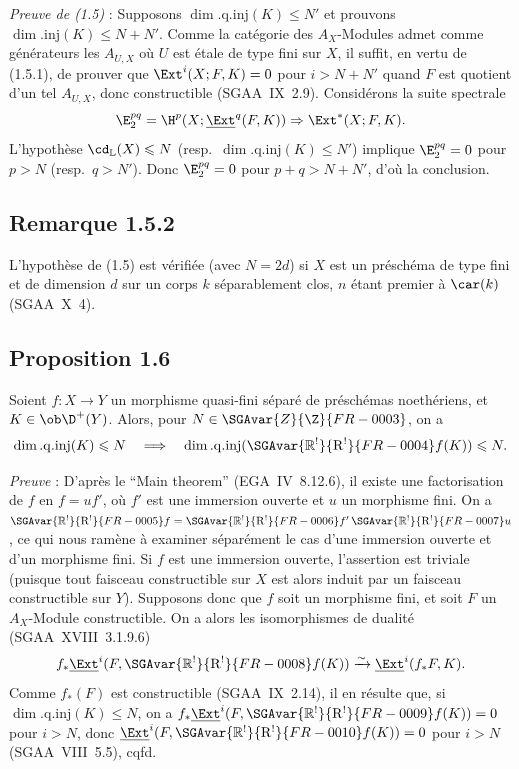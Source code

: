 \emph{Preuve de (1.5)} : Supposons $\dim.\mathrm{q.inj}(K) \leqslant N'$ et prouvons $\dim.\mathrm{inj}(K) \leqslant N + N'$. Comme la catégorie des $A_X$-Modules admet comme générateurs les $A_{U,X}$ où $U$ est étale de type fini sur $X$, il suffit, en vertu de (1.5.1), de prouver que $\Ext^i(X; F,K) = 0$ pour $i > N + N'$ quand $F$ est quotient d'un tel $A_{U,X}$, donc constructible (SGAA~IX~2.9). Considérons la suite spectrale
\[
\E_2^{pq} = \H^p(X; \underline{\Ext}^q(F,K)) \Rightarrow \Ext^{*}(X; F,K).
\]
L'hypothèse $\cd_{\mathbb{L}}(X) \leqslant N$ (resp.~$\dim.\mathrm{q.inj}(K) \leqslant N'$) implique $\E_2^{pq} = 0$ pour $p > N$ (resp.~$q > N'$). Donc $\E_2^{pq} = 0$ pour $p+q > N+N'$, d'où la conclusion.

\subsection*{Remarque 1.5.2}
L'hypothèse de (1.5) est vérifiée (avec $N = 2d$) si $X$ est un préschéma de type fini et de dimension $d$ sur un corps $k$ séparablement clos, $n$ étant premier à $\car(k)$ (SGAA~X~4).

\subsection*{Proposition 1.6}
Soient $f : X \to Y$ un morphisme quasi-fini séparé de préschémas noethériens, et $K \in \ob \D^{+}(Y)$. Alors, pour $N \in \SGAvar{Z}{\Z}{FR-0003}$, on a
\[
\dim.\mathrm{q.inj}(K) \leqslant N \quad \Longrightarrow \quad \dim.\mathrm{q.inj}(\SGAvar{\mathbb{R}^{!}}{\mathrm{R}^{!}}{FR-0004}f(K)) \leqslant N.
\]

\emph{Preuve} : D'après le ``Main theorem'' (EGA~IV~8.12.6), il existe une factorisation de $f$ en $f = uf'$, où $f'$ est une immersion ouverte et $u$ un morphisme fini. On a $\SGAvar{\mathbb{R}^{!}}{\mathrm{R}^{!}}{FR-0005}f = \SGAvar{\mathbb{R}^{!}}{\mathrm{R}^{!}}{FR-0006}f' \, \SGAvar{\mathbb{R}^{!}}{\mathrm{R}^{!}}{FR-0007}u$, ce qui nous ramène à examiner séparément le cas d'une immersion ouverte et d'un morphisme fini. Si $f$ est une immersion ouverte, l'assertion est triviale (puisque tout faisceau constructible sur $X$ est alors induit par un faisceau constructible sur $Y$). Supposons donc que $f$ soit un morphisme fini, et soit $F$ un $A_X$-Module constructible. On a alors les isomorphismes de dualité (SGAA~XVIII~3.1.9.6)
\[
f_{*}\underline{\Ext}^i(F, \SGAvar{\mathbb{R}^{!}}{\mathrm{R}^{!}}{FR-0008}f(K)) \xrightarrow{\sim} \underline{\Ext}^i(f_{*}F, K).
\]
Comme $f_{*}(F)$ est constructible (SGAA~IX~2.14), il en résulte que, si $\dim.\mathrm{q.inj}(K) \leqslant N$, on a $f_{*}\underline{\Ext}^i(F, \SGAvar{\mathbb{R}^{!}}{\mathrm{R}^{!}}{FR-0009}f(K)) = 0$ pour $i > N$, donc $\underline{\Ext}^i(F, \SGAvar{\mathbb{R}^{!}}{\mathrm{R}^{!}}{FR-0010}f(K)) = 0$ pour $i > N$ (SGAA~VIII~5.5), cqfd.

